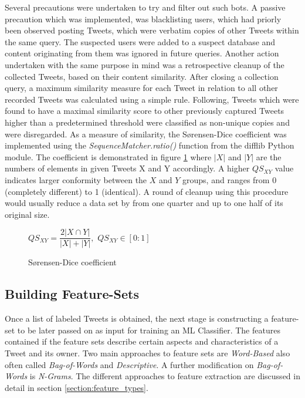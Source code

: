 		\noindent
		Several precautions were undertaken to try and filter out such bots. A passive precaution which was implemented, was blacklisting users, which had priorly been observed posting Tweets, which were verbatim copies of other Tweets within the same query. The suspected users were added to a suspect database and content originating from them was ignored in future queries. Another action undertaken with the same purpose in mind was a retrospective cleanup of the collected Tweets, based on their content similarity. After closing a collection query, a maximum similarity measure for each Tweet in relation to all other recorded Tweets was calculated using a simple rule. Following, Tweets which were found to have a maximal similarity score to other previously captured Tweets  higher than a predetermined threshold were classified as non-unique copies and were disregarded. As a measure of similarity, the S\o rensen-Dice coefficient \cite{sorensen1948method} was implemented  using the \textit{SequenceMatcher.ratio()} function from the difflib Python module. The coefficient is demonstrated in figure \ref{fig:sorenson_dice} where $|X|$ and $|Y|$ are the numbers of elements in given Tweets X and Y accordingly. A higher $ QS_{XY} $ value indicates larger conformity between the $ X $ and $ Y $ groups, and ranges from 0 (completely different) to 1 (identical). A round of cleanup using this procedure would usually reduce a data set by from one quarter and up to one half of its original size.
		
		\begin{figure}[h]
			\begin{center}
				$QS_{XY} = \dfrac{2|X\cap Y|}{|X|+|Y|},$ \hspace{10pt}  $QS_{XY} \in [0:1]$
			\end{center}
			\caption{S\o rensen-Dice coefficient}
			\label{fig:sorenson_dice}
		\end{figure}
		
	\subsection{Building Feature-Sets}
	\label{build_features}
	Once a list of labeled Tweets is obtained, the next stage is constructing a feature-set to be later passed on as input for training an ML Classifier. The features contained if the feature sets describe certain aspects and characteristics of a Tweet and its owner. Two main approaches to feature sets are \textit{Word-Based} also often called \textit{Bag-of-Words} and \textit{Descriptive}. A further modification on \textit{Bag-of-Words} is \textit{N-Grams}. The different approaches to feature extraction are discussed in detail in section \ref{section:feature_types}.
	

